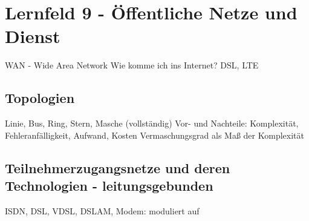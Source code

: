 \section{Lernfeld 9 - Öffentliche Netze und Dienst}

WAN - Wide Area Network
Wie komme ich ins Internet?
DSL, LTE

\subsection{Topologien}

Linie, Bus, Ring, Stern, Masche (vollständig)
Vor- und Nachteile: Komplexität, Fehleranfälligkeit, Aufwand, Kosten
Vermaschungsgrad als Maß der Komplexität


\subsection{Teilnehmerzugangsnetze und deren Technologien - leitungsgebunden}
ISDN, DSL, VDSL, DSLAM, Modem: moduliert auf


